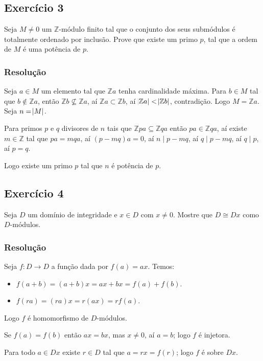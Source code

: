 \documentclass[10pt,a4paper]{article}
\begin{document}
\subsection*{Exercício 3}

Seja $M\neq 0$ um $\mathbb{Z}$-módulo finito tal que o conjunto dos seus submódulos é totalmente ordenado por inclusão. Prove que existe um primo $p$, tal que a ordem de $M$ é uma potência de $p$.

\subsubsection*{Resolução}

Seja $a\in M$ um elemento tal que $\mathbb{Z}a$ tenha cardinalidade máxima. Para $b\in M$ tal que $b\notin\mathbb{Z}a$, então $\mathbb{Z}b\nsubseteq\mathbb{Z}a$, aí $\mathbb{Z}a\subset\mathbb{Z}b$, aí $\abs{\mathbb{Z}a}<\abs{\mathbb{Z}b}$, contradição. Logo $M=\mathbb{Z}a$. Seja $n=\abs{M}$.

\medskip
\noindent
Para primos $p$ e $q$ divisores de $n$ tais que $\mathbb{Z}pa\subseteq\mathbb{Z}qa$ então $pa\in\mathbb{Z}qa$, aí existe $m\in\mathbb{Z}$ tal que $pa=mqa$, aí $(p-mq)a=0$, aí $n\mid p-mq$, aí $q\mid p-mq$, aí $q\mid p$, aí $p=q$.

\medskip
\noindent
Logo existe um primo $p$ tal que $n$ é potência de $p$.

\subsection*{Exercício 4}

Seja $D$ um domínio de integridade e $x\in D$ com $x\neq 0$. Mostre que $D\cong Dx$ como $D$-módulos.

\subsubsection*{Resolução}

Seja $f:D\rightarrow D$ a função dada por $f(a)=ax$. Temos:
\begin{itemize}
\item $f(a+b)=(a+b)x=ax+bx=f(a)+f(b)$.
\item $f(ra)=(ra)x=r(ax)=rf(a)$.
\end{itemize}
Logo $f$ é homomorfismo de $D$-módulos.

\medskip
\noindent
Se $f(a)=f(b)$ então $ax=bx$, mas $x\neq 0$, aí $a=b$; logo $f$ é injetora.

\medskip
\noindent
Para todo $a\in Dx$ existe $r\in D$ tal que $a=rx=f(r)$; logo $f$ é sobre $Dx$.
\end{document}

